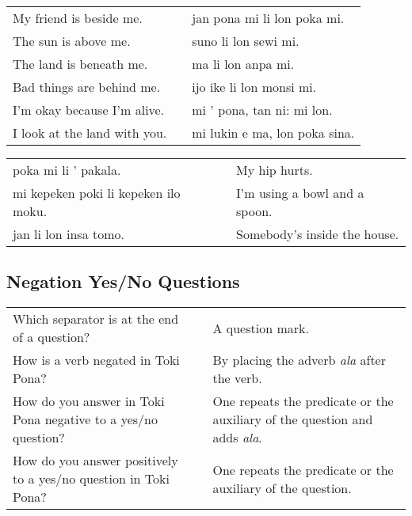 \begin{supertabular}{p{5,5cm}|ll}
    My friend is beside me.      &  & jan pona mi li lon poka mi.   \\ %
    The sun is above me.         &  & suno li lon sewi mi.          \\ %
    The land is beneath me.      &  & ma li lon anpa mi.            \\ %
    Bad things are behind me.    &  & ijo ike li lon monsi mi.      \\ %
    I'm okay because I'm alive.  &  & mi ' pona, tan ni: mi lon.    \\ %
    I look at the land with you. &  & mi lukin e ma, lon poka sina. \\ %
\end{supertabular}

\begin{supertabular}{p{5,5cm}|ll}
    poka mi li ' pakala.                 &  & My hip hurts.                 \\
    mi kepeken poki li kepeken ilo moku. &  & I'm using a bowl and a spoon. \\
    jan li lon insa tomo.                &  & Somebody's inside the house.  \\
\end{supertabular}

\newpage
%
\subsection*{Negation Yes/No Questions}
\label{'negation_yes_no_questions'}
%
\begin{supertabular}{p{5,5cm}|ll}
    Which separator is at the end of a question?                    &  & A question mark.                                                                  \\ %
    How is a verb negated in Toki Pona?                             &  & By placing the adverb \textit{ala} after the verb.                                \\ %
    How do you answer in Toki Pona negative to a yes/no question?   &  & One repeats the predicate or the auxiliary of the question and adds \textit{ala}. \\ %
    How do you answer positively to a yes/no question in Toki Pona? &  & One repeats the predicate or the auxiliary of the question.                       \\ %
\end{supertabular}

